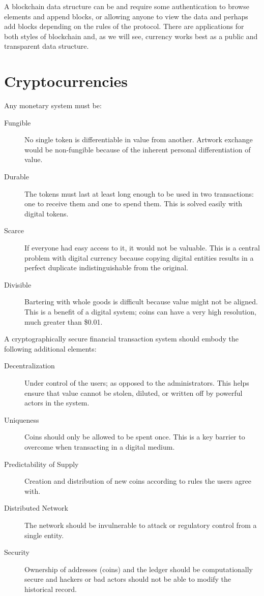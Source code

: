 A blockchain data structure can be  and require some authentication to browse elements and append blocks, or  allowing anyone to view the data and perhaps add blocks depending on the rules of the protocol. There are applications for both styles of blockchain and, as we will see, currency works best as a public and transparent data structure.

\section{Cryptocurrencies}\label{Se:Cryptocurrencies}
Any monetary system must be:

	\begin{description}
	\item[Fungible] No single token is differentiable in value from another. Artwork exchange would be non-fungible because of the inherent personal differentiation of value.
	\item [Durable] The tokens must last at least long enough to be used in two transactions: one to receive them and one to spend them. This is solved easily with digital tokens.
	\item [Scarce] If everyone had easy access to it, it would not be valuable. This is a central problem with digital currency because copying digital entities results in a perfect duplicate indistinguishable from the original.
	\item [Divisible] Bartering with whole goods is difficult because value might not be aligned. This is a benefit of a digital system; coins can have a very high resolution, much greater than \$0.01.
	\end{description} 

A cryptographically secure financial transaction system should embody the following additional elements:
	\begin{description}	
	\item [Decentralization] Under control of the users; as opposed to the administrators. This helps ensure that value cannot be stolen, diluted, or written off by powerful actors in the system.
	\item [Uniqueness] Coins should only be allowed to be spent once. This is a key barrier to overcome when transacting in a digital medium.
	\item [Predictability of Supply] Creation and distribution of new coins according to rules the users agree with. 
	\item [Distributed Network] The network should be invulnerable to attack or regulatory control from a single entity.
	\item [Security] Ownership of addresses (coins) and the ledger should be computationally secure and  hackers or bad actors should not be able to modify the historical record.
\end{description}
